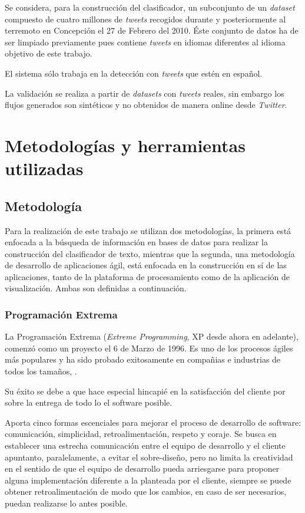 Se considera, para la construcción del clasificador, un subconjunto de un \textit{dataset} compuesto de cuatro millones de \textit{tweets} recogidos durante y posteriormente al terremoto en Concepción el 27 de Febrero del 2010. Éste conjunto de datos ha de ser limpiado previamente pues contiene \textit{tweets} en idiomas diferentes al idioma objetivo de este trabajo.

El sistema sólo trabaja en la detección con \textit{tweets} que estén en español.

La validación se realiza a partir de \textit{datasets} con \textit{tweets} reales, sin embargo los flujos generados son sintéticos y no obtenidos de manera online desde \textit{Twitter}.

\section{Metodologías y herramientas utilizadas}
\label{intro:metodologia}

\subsection{Metodología}
\label{subsec:MetodologiaDetalle}

Para la realización de este trabajo se utilizan dos metodologías, la primera está enfocada a la búsqueda de información en bases de datos para realizar la construcción del clasificador de texto, mientras que la segunda, una metodología de desarrollo de aplicaciones ágil, está enfocada en la construcción en sí de las aplicaciones, tanto de la plataforma de procesamiento como de la aplicación de visualización. Ambas son definidas a continuación.

\subsubsection*{Programación Extrema}
\label{subsubsec:XP}

La Programación Extrema (\textit{Extreme Programming}, XP desde ahora en adelante), comenzó como un proyecto el 6 de Marzo de 1996. Es uno de los procesos ágiles más populares y ha sido probado exitosamente en compañias e industrias de todos los tamaños, \cite{XP}.

Su éxito se debe a que hace especial hincapié en la satisfacción del cliente por sobre la entrega de todo lo el software posible.

Aporta cinco formas escenciales para mejorar el proceso de desarrollo de software: comunicación, simplicidad, retroalimentación, respeto y coraje. Se busca en establecer una estrecha comunicación entre el equipo de desarrollo y el cliente apuntanto, paralelamente, a evitar el sobre-diseño, pero no limita la creatividad en el sentido de que el equipo de desarrollo pueda arriesgarse para proponer alguna implementación diferente a la planteada por el cliente, siempre se puede obtener retroalimentación de modo que los cambios, en caso de ser necesarios, puedan realizarse lo antes posible. 

